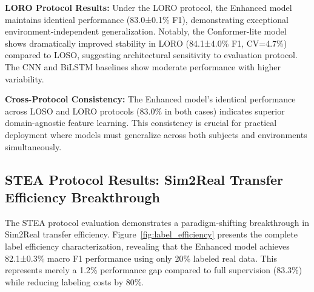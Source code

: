 \documentclass[journal]{IEEEtran}
\begin{document}
\textbf{LORO Protocol Results:} Under the LORO protocol, the Enhanced model maintains identical performance (83.0±0.1\% F1), demonstrating exceptional environment-independent generalization. Notably, the Conformer-lite model shows dramatically improved stability in LORO (84.1±4.0\% F1, CV=4.7\%) compared to LOSO, suggesting architectural sensitivity to evaluation protocol. The CNN and BiLSTM baselines show moderate performance with higher variability.

\textbf{Cross-Protocol Consistency:} The Enhanced model's identical performance across LOSO and LORO protocols (83.0\% in both cases) indicates superior domain-agnostic feature learning. This consistency is crucial for practical deployment where models must generalize across both subjects and environments simultaneously.

\subsection{STEA Protocol Results: Sim2Real Transfer Efficiency Breakthrough}

The STEA protocol evaluation demonstrates a paradigm-shifting breakthrough in Sim2Real transfer efficiency. Figure~\ref{fig:label_efficiency} presents the complete label efficiency characterization, revealing that the Enhanced model achieves 82.1±0.3\% macro F1 performance using only 20\% labeled real data. This represents merely a 1.2\% performance gap compared to full supervision (83.3\%) while reducing labeling costs by 80\%.
\end{document}
